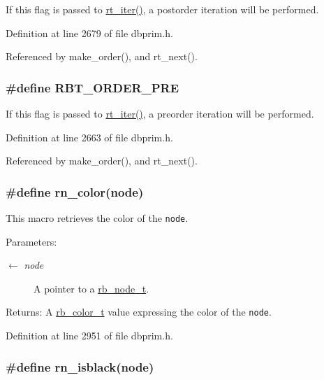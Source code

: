 If this flag is passed to \hyperlink{group__dbprim__rbtree_ga11}{rt\_\-iter()}, a postorder iteration will be performed.

Definition at line 2679 of file dbprim.h.

Referenced by make\_\-order(), and rt\_\-next().\hypertarget{group__dbprim__rbtree_ga24}{
\subsubsection[RBT\_\-ORDER\_\-PRE]{\setlength{\rightskip}{0pt plus 5cm}\#define RBT\_\-ORDER\_\-PRE}}
\label{group__dbprim__rbtree_ga24}


If this flag is passed to \hyperlink{group__dbprim__rbtree_ga11}{rt\_\-iter()}, a preorder iteration will be performed.

Definition at line 2663 of file dbprim.h.

Referenced by make\_\-order(), and rt\_\-next().\hypertarget{group__dbprim__rbtree_ga32}{
\subsubsection[rn\_\-color]{\setlength{\rightskip}{0pt plus 5cm}\#define rn\_\-color(node)}}
\label{group__dbprim__rbtree_ga32}


This macro retrieves the color of the {\tt node}.

\begin{Desc}
\item[Parameters:]
\begin{description}
\item[\mbox{$\leftarrow$} {\em node}]A pointer to a \hyperlink{group__dbprim__rbtree_ga1}{rb\_\-node\_\-t}.\end{description}
\end{Desc}
\begin{Desc}
\item[Returns:]A \hyperlink{group__dbprim__rbtree_ga4}{rb\_\-color\_\-t} value expressing the color of the {\tt node}.\end{Desc}


Definition at line 2951 of file dbprim.h.\hypertarget{group__dbprim__rbtree_ga39}{
\subsubsection[rn\_\-isblack]{\setlength{\rightskip}{0pt plus 5cm}\#define rn\_\-isblack(node)}}
\label{group__dbprim__rbtree_ga39}


